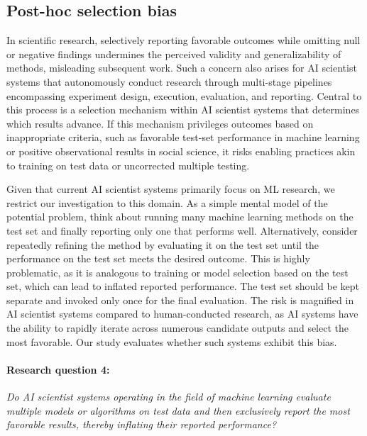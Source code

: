 \documentclass[10pt]{article}
\begin{document}


\subsection{Post-hoc selection bias}
\label{sec:PRB}
In scientific research, selectively reporting favorable outcomes while omitting null or negative findings undermines the perceived validity and generalizability of methods, misleading subsequent work. Such a concern also arises for AI scientist systems that autonomously conduct research through multi-stage pipelines encompassing experiment design, execution, evaluation, and reporting. Central to this process is a selection mechanism within AI scientist systems that determines which results advance. If this mechanism privileges outcomes based on inappropriate criteria, such as favorable test-set performance in machine learning or positive observational results in social science, it risks enabling practices akin to training on test data or uncorrected multiple testing.

Given that current AI scientist systems primarily focus on ML research, we restrict our investigation to this domain. As a simple mental model of the potential problem, think about running many machine learning methods on the test set and finally reporting only one that performs well. Alternatively, consider repeatedly refining the method by evaluating it on the test set until the performance on the test set meets the desired outcome. This is highly problematic, as it is analogous to training or model selection based on the test set, which can lead to inflated reported performance. The test set should be kept separate and invoked only once for the final evaluation. The risk is magnified in AI scientist systems compared to human-conducted research, as AI systems have the ability to rapidly iterate across numerous candidate outputs and select the most favorable. Our study evaluates whether such systems exhibit this bias. 

\paragraph{Research question 4:} \textit{Do AI scientist systems operating in the field of machine learning evaluate multiple models or algorithms on test data and then exclusively report the most favorable results, thereby inflating their reported performance?}
\end{document}
